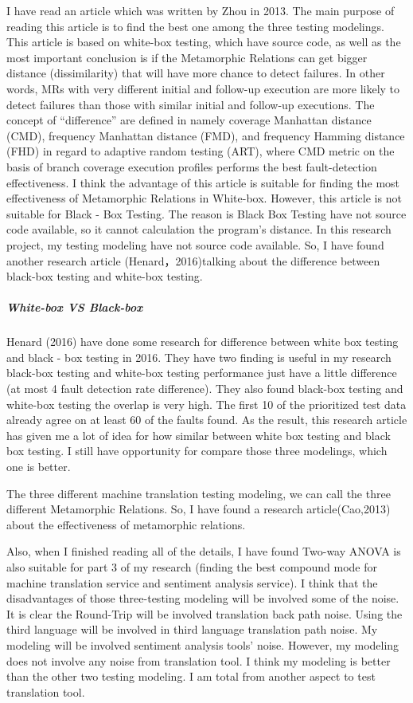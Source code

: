 \documentclass[conference]{IEEEtran}
\begin{document}
I have read an article which was written by Zhou in 2013. The main purpose of reading this article is to find the best one among the three testing modelings. This article is based on white-box testing, which have source code, as well as the most important conclusion is if the Metamorphic Relations can get bigger distance (dissimilarity) that will have more chance to detect failures.  In other words, MRs with very different initial and follow-up execution are more likely to detect failures than those with similar initial and follow-up executions. The concept of “difference” are defined in namely coverage Manhattan distance (CMD), frequency Manhattan distance (FMD), and frequency Hamming distance (FHD) in regard to adaptive random testing (ART), where CMD metric on the basis of branch coverage execution profiles performs the best fault-detection effectiveness.
 I think the advantage of this article is suitable for finding the most effectiveness of Metamorphic Relations in White-box. However, this article is not suitable for Black - Box Testing. The reason is Black Box Testing have not source code available, so it cannot calculation the program’s distance. In this research project, my testing modeling have not source code available. So, I have found another research article (Henard，2016)talking about the difference between black-box testing and white-box testing.

\subparagraph{White-box VS Black-box}
Henard (2016) have done some research for difference between white box testing
and black - box testing in 2016. They have two finding is useful in my research
black-box testing and white-box testing performance just have a little
difference (at most 4 fault detection rate difference). They also found
black-box testing and white-box testing the overlap is
very high. The first 10 of the prioritized test data
already agree on at least 60 of the faults found. As the
result, this research article has given me a lot of idea
for how similar between white box testing and black box
testing. I still have opportunity for compare those three
modelings, which one is better.




The three different machine translation testing modeling, we can call the three
different Metamorphic Relations. So, I have found a research article(Cao,2013)
about the effectiveness of metamorphic relations.

Also, when I finished reading all of the details, I have found Two-way ANOVA is also suitable for part 3 of my research (finding the best compound mode for machine translation service and sentiment analysis service).
I think that the disadvantages of those three-testing modeling will be involved some of the noise.
 It is clear the Round-Trip will be involved translation back path noise. Using the third language will be involved in third language translation path noise. My modeling will be involved sentiment analysis tools’ noise. However, my modeling does not involve any noise from translation tool. I think my modeling is better than the other two testing modeling. I am total from another aspect to test translation tool.
\end{document}
